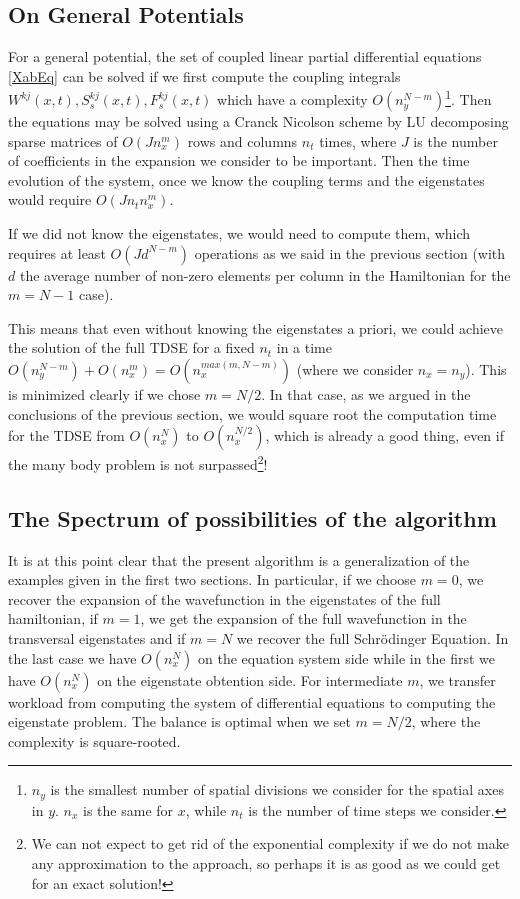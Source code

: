 \documentclass[11pt, a4paper]{article} %
\begin{document}
\subsection{On General Potentials}
For a general potential, the set of coupled linear partial differential equations \eqref{XabEq} can be solved if we first compute the coupling integrals $W^{kj}(x,t),S^{kj}_s(x,t),F^{kj}_s(x,t)$ which have a complexity $O(n_y^{N-m})$\footnote{$n_y$ is the smallest number of spatial divisions we consider for the spatial axes in $y$. $n_x$ is the same for $x$, while $n_t$ is the number of time steps we consider.}. Then the equations may be solved using a Cranck Nicolson scheme by LU decomposing sparse matrices of $O(Jn_x^m)$ rows and columns $n_t$ times, where $J$ is the number of coefficients in the expansion we consider to be important. Then the time evolution of the system, once we know the coupling terms and the eigenstates would require $O(Jn_tn_x^m)$.

If we did not know the eigenstates, we would need to compute them, which requires at least $O(Jd^{N-m})$ operations as we said in the previous section (with $d$ the average number of non-zero elements per column in the Hamiltonian for the $m=N-1$ case).

This means that even without knowing the eigenstates a priori, we could achieve the solution of the full TDSE for a fixed $n_t$ in a time $O(n_y^{N-m})+O(n_x^{m})=O(n_x^{max(m, N-m)})$ (where we consider $n_x=n_y$). This is minimized clearly if we chose $m=N/2$. In that case, as we argued in the conclusions of the previous section, we would square root the computation time for the TDSE from $O(n_x^{N})$ to $O(n_x^{N/2})$, which is already a good thing, even if the many body problem is not surpassed\footnote{We can not expect to get rid of the exponential complexity if we do not make any approximation to the approach, so perhaps it is as good as we could get for an exact solution!}!

\subsection{The Spectrum of possibilities of the algorithm}
It is at this point clear that the present algorithm is a generalization of the examples given in the first two sections. In particular, if we choose $m=0$, we recover the expansion of the wavefunction in the eigenstates of the full hamiltonian, if $m=1$, we get the expansion of the full wavefunction in the transversal eigenstates and if $m=N$ we recover the full Schrödinger Equation. In the last case we have $O(n_x^N)$ on the equation system side while in the first we have $O(n_x^N)$ on the eigenstate obtention side. For intermediate $m$, we transfer workload from computing the system of differential equations to computing the eigenstate problem. The balance is optimal when we set $m=N/2$, where the complexity is square-rooted.
\end{document}
